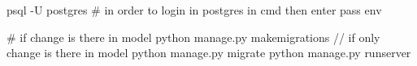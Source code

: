 psql -U postgres    # in order to login in postgres in cmd then enter pass
env\Scripts\activate

# if change is there in model
python manage.py makemigrations  // if only change is there in model
python manage.py migrate
python manage.py runserver

